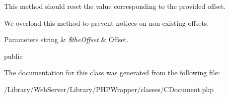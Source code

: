 This method should reset the value corresponding to the provided offset.

We overload this method to prevent notices on non-\/existing offsets.


\begin{DoxyParams}[1]{Parameters}
string & {\em \$the\-Offset} & Offset.\\
\hline
\end{DoxyParams}
public 

The documentation for this class was generated from the following file\-:\begin{DoxyCompactItemize}
\item 
/\-Library/\-Web\-Server/\-Library/\-P\-H\-P\-Wrapper/classes/C\-Document.\-php\end{DoxyCompactItemize}
